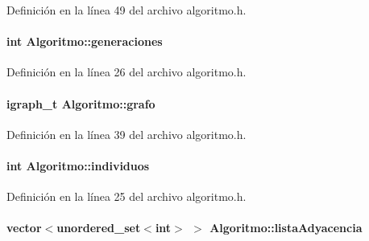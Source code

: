 Definición en la línea 49 del archivo algoritmo.\-h.

\hypertarget{class_algoritmo_a76362b4a8f794e6206dcbeec3fe7a628}{
\paragraph[{generaciones}]{\setlength{\rightskip}{0pt plus 5cm}int Algoritmo\-::generaciones\hspace{0.3cm}{\ttfamily [private]}}}\label{class_algoritmo_a76362b4a8f794e6206dcbeec3fe7a628}


Definición en la línea 26 del archivo algoritmo.\-h.

\hypertarget{class_algoritmo_a5bf75458f302256836f8c021c696b6d6}{
\paragraph[{grafo}]{\setlength{\rightskip}{0pt plus 5cm}igraph\-\_\-t Algoritmo\-::grafo\hspace{0.3cm}{\ttfamily [private]}}}\label{class_algoritmo_a5bf75458f302256836f8c021c696b6d6}


Definición en la línea 39 del archivo algoritmo.\-h.

\hypertarget{class_algoritmo_a5b2603327a6c450a76a6852ac26fe7a2}{
\paragraph[{individuos}]{\setlength{\rightskip}{0pt plus 5cm}int Algoritmo\-::individuos\hspace{0.3cm}{\ttfamily [private]}}}\label{class_algoritmo_a5b2603327a6c450a76a6852ac26fe7a2}


Definición en la línea 25 del archivo algoritmo.\-h.

\hypertarget{class_algoritmo_a93ba06ec3089ad3b17037b2432136477}{
\paragraph[{lista\-Adyacencia}]{\setlength{\rightskip}{0pt plus 5cm}vector$<$unordered\-\_\-set$<$int$>$ $>$ Algoritmo\-::lista\-Adyacencia\hspace{0.3cm}{\ttfamily [private]}}}\label{class_algoritmo_a93ba06ec3089ad3b17037b2432136477}


